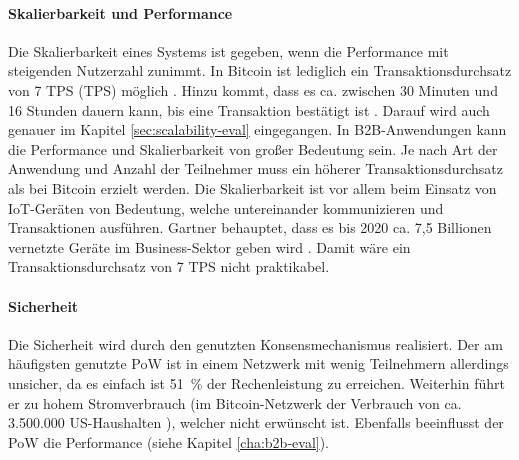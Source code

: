 \paragraph{Skalierbarkeit und Performance}
Die Skalierbarkeit eines Systems ist gegeben, wenn die Performance mit steigenden Nutzerzahl zunimmt. In Bitcoin ist lediglich ein Transaktionsdurchsatz von 7 \acl{TPS} (\acs{TPS}) möglich \cite{ZhengBlockchainChallengesOpportunities2017}. Hinzu kommt, dass es ca. zwischen 30 Minuten und 16 Stunden dauern kann, bis eine Transaktion bestätigt ist \cite{BuchkoHowLongBitcoin2017}. Darauf wird auch genauer im Kapitel \ref{sec:scalability-eval} eingegangen. In \acs{B2B}-Anwendungen kann die Performance und Skalierbarkeit von großer Bedeutung sein. Je nach Art der Anwendung und Anzahl der Teilnehmer muss ein höherer Transaktionsdurchsatz als bei Bitcoin erzielt werden. Die Skalierbarkeit ist vor allem beim Einsatz von \acs{IoT}-Geräten von Bedeutung, welche untereinander kommunizieren und Transaktionen ausführen. Gartner behauptet, dass es bis 2020 ca. 7,5 Billionen vernetzte Geräte im Business-Sektor geben wird \cite{RobGartnerSaysBillion2017}. Damit wäre ein Transaktionsdurchsatz von 7 \acs{TPS} nicht praktikabel.

\paragraph{Sicherheit}
Die Sicherheit wird durch den genutzten Konsensmechanismus realisiert. Der am häufigsten genutzte \acs{PoW} ist in einem Netzwerk mit wenig Teilnehmern allerdings unsicher, da es einfach ist 51~\% der Rechenleistung zu erreichen. Weiterhin führt er zu hohem Stromverbrauch (im Bitcoin-Netzwerk der Verbrauch von ca. 3.500.000 US-Haushalten \cite{DigiconomistBitcoinEnergyConsumption}), welcher nicht erwünscht ist. Ebenfalls beeinflusst der \acs{PoW} die Performance (siehe Kapitel \ref{cha:b2b-eval}).



